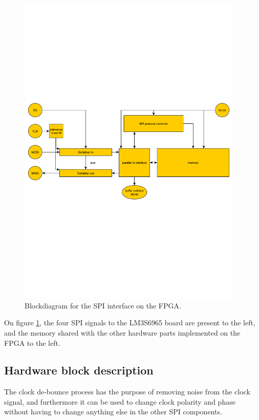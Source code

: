 \begin{figure}[htb] 
	\centering
  \includegraphics[width=0.96\textwidth,clip,trim=0 270 0 270]{graphics/spi_protocol_fpga_blocks_final_design.pdf}%
	\caption{Blockdiagram for the SPI interface on the FPGA.}
	\label{fig:spi_protocol_fpga_blocks_final_design}			%
\end{figure}

On figure \ref{fig:spi_protocol_fpga_blocks_final_design}, the four SPI signals to the LM3S6965 board are present to the left, and the memory shared with the other hardware parts implemented on the FPGA to the left.

\subsection{Hardware block description}
The clock de-bounce process has the purpose of removing noise from the clock signal, and furthermore it can be used to change clock polarity and phase without having to change anything else in the other SPI components.

